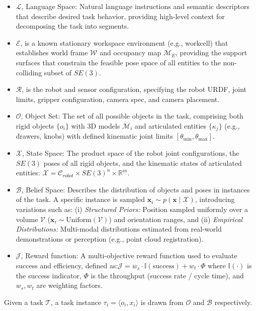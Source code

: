 \begin{itemize} [nosep, leftmargin=*]
    \item $\mathcal{L}$, Language Space: Natural language instructions and semantic descriptors that describe desired task behavior, providing high-level context for decomposing the task into segments.
    \item $\mathcal{E}$, is a known stationary workspace environment (e.g., workcell) that establishes world frame $\mathcal{W}$ and occupancy map $\mathcal{M}_E$, providing the support surfaces that constrain the feasible pose space of all entities to the non-colliding subset of $SE(3)$.
    \item $\mathcal{R}$, is the {robot and sensor configuration}, specifying the robot URDF, joint limits, gripper configuration, camera spec, and camera placement.
    \item $\mathcal{O}$, Object Set: The set of all possible objects in the task, comprising both rigid objects $\{o_i\}$ with 3D models $\mathcal{M}_i$ and articulated entities $\{\kappa_j\}$ (e.g., drawers, knobs) with defined kinematic joint limits $[\theta_{\min}, \theta_{\max}]$.
    \item {$\mathcal{X}$, State Space:}  The product space of the robot joint configurations, the $SE(3)$ poses of all rigid objects, and the kinematic states of articulated entities: $\mathcal{X} = \mathcal{C}_{robot} \times SE(3)^n \times \mathbb{R}^m$.
    \item {$\mathcal{B}$, Belief Space:} Describes the distribution of objects and poses in instances of the task. A specific instance is sampled $\mathbf{x}_i \sim p(\mathbf{x} \mid\mathcal{X})$, introducing variations such as: (i) \textit{Structured Priors:} Position sampled uniformly over a volume $\mathcal{V}$ ($\mathbf{x}_i \sim \text{Uniform}(\mathcal{V})$) and orientation ranges, and (ii) \textit{Empirical Distributions:} Multi-modal distributions estimated from real-world demonstrations or perception (e.g., point cloud registration).
    \item $\mathcal{J}$, Reward function: A multi-objective reward function used to evaluate success and efficiency, defined as:$\mathcal{J} = w_s \cdot \mathbb{I}(\text{success}) + w_t \cdot \Phi$ where $\mathbb{I}(\cdot)$ is the success indicator, $\Phi$ is the throughput (success rate / cycle time), and $w_s, w_t$ are weighting factors.

\end{itemize}

Given a task $\mathcal{T}$, a task instance $\tau_i = \langle o_i, x_i \rangle$ is drawn from $\mathcal{O}$ and $\mathcal{B}$ respectively.
   
